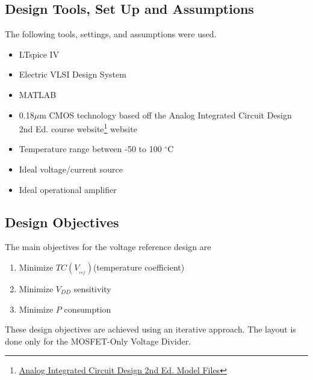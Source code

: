 \documentclass[conference]{IEEEtran}
\begin{document}
\subsection{Design Tools, Set Up and Assumptions}
The following tools, settings, and assumptions were used.
\begin{itemize}
  \item LTspice IV
  \item Electric VLSI Design System
  \item MATLAB
  \item 0.18$\mu$m CMOS technology based off the Analog Integrated Circuit Design 2nd Ed. course website\footnote{\href{http://analogicdesign.com/students/netlists-models/model-files/}{Analog Integrated Circuit Design 2nd Ed. Model Files}} website
  \item Temperature range between -50 to 100 $^\circ$C
  \item Ideal voltage/current source
  \item Ideal operational amplifier
\end{itemize}

\subsection{Design Objectives}
The main objectives for the voltage reference design are
\begin{enumerate}
  \item Minimize $TC(V_{_{ref}})$\;(temperature coefficient)
  \item Minimize $V_{DD}$ sensitivity
  \item Minimize $P$ consumption
\end{enumerate}
These design objectives are achieved using an iterative approach.  The layout is done only for the MOSFET-Only Voltage Divider.
\end{document}
